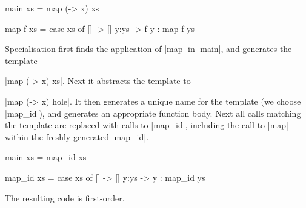 \documentclass[preprint]{sigplanconf}
\begin{document}
\begin{example}
\label{ex:map_id}
\begin{code}
main xs = map (\x -> x) xs

map f xs = case  xs of
                 []    -> []
                 y:ys  -> f y : map f ys
\end{code}

Specialisation first finds the application of |map| in |main|, and generates the template \ignore|map (\x -> x) xs|. Next it abstracts the template to \ignore|map (\x -> x) hole|. It then generates a unique name for the template (we choose |map_id|), and generates an appropriate function body. Next all calls matching the template are replaced with calls to |map_id|, including the call to |map| within the freshly generated |map_id|.

\begin{code}
main xs = map_id xs

map_id xs = case  xs of
                  []    -> []
                  y:ys  -> y : map_id ys
\end{code}

\noindent The resulting code is first-order.
\end{example}

\begin{comment}
\begin{figure}

\begin{code}
shouldSpecialise :: Expr -> Bool
shouldSpecialise (EFun f xs_) = any (\x -> isLambda x || isBox x) (universe (EFun f xs_))
shouldSpecialise _ = False

abstractTemplate :: Expr -> Expr
abstractTemplate x =
    transform (\x -> if abstract x then hole else x) $
    abstractVars (freeVars x) x

abstract :: Expr -> Bool
abstract (ECon c xs_) = all abstract xs_
abstract (EFun f xs_) = all abstract xs_
abstract (EApp x xs_) = all abstract xs_
abstract (ELet v x y) = abstract x && abstract (abstractVars [v] y)
abstract (ECase x alts_) = abstract x && all alt alts_
   where alt (EAlt c vs_ x) = abstract (abstractVars vs_ x)
abstract x = (x == hole)

abstractVars :: [VarName] -> Expr -> Expr
abstractVars vs x = ellipses
    -- replace the variables |vs| in |x| with |abstract|
    -- respecting variables rebound locally
\end{code}
\caption{Template generation function.}
\label{fig:template_generation}
\end{figure}
\end{comment}
\end{document}
